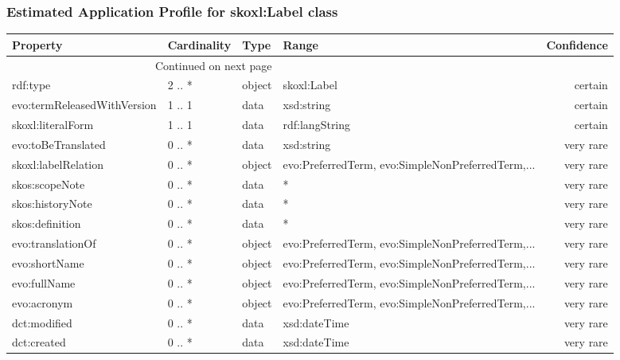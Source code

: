 \documentclass[10pt,a4paper,titlepage,final]{article}
\begin{document}
\subsubsection{Estimated Application Profile for skoxl:Label class}
\begin{tabularx}{\textwidth}{lllXr}
\toprule
                    Property & Cardinality &    Type &                                              Range & Confidence \\
\midrule
\endhead
\midrule
\multicolumn{3}{r}{{Continued on next page}} \\
\midrule
\endfoot

\bottomrule
\endlastfoot
                    rdf:type &      2 .. * &  object &                                        skoxl:Label &    certain \\
 evo:termReleasedWithVersion &      1 .. 1 &    data &                                         xsd:string &    certain \\
           skoxl:literalForm &      1 .. 1 &    data &                                     rdf:langString &    certain \\
          evo:toBeTranslated &      0 .. * &    data &                                         xsd:string &  very rare \\
         skoxl:labelRelation &      0 .. * &  object &  evo:PreferredTerm, evo:SimpleNonPreferredTerm,... &  very rare \\
              skos:scopeNote &      0 .. * &    data &                                                  * &  very rare \\
            skos:historyNote &      0 .. * &    data &                                                  * &  very rare \\
             skos:definition &      0 .. * &    data &                                                  * &  very rare \\
           evo:translationOf &      0 .. * &  object &  evo:PreferredTerm, evo:SimpleNonPreferredTerm,... &  very rare \\
               evo:shortName &      0 .. * &  object &  evo:PreferredTerm, evo:SimpleNonPreferredTerm,... &  very rare \\
                evo:fullName &      0 .. * &  object &  evo:PreferredTerm, evo:SimpleNonPreferredTerm,... &  very rare \\
                 evo:acronym &      0 .. * &  object &  evo:PreferredTerm, evo:SimpleNonPreferredTerm,... &  very rare \\
                dct:modified &      0 .. * &    data &                                       xsd:dateTime &  very rare \\
                 dct:created &      0 .. * &    data &                                       xsd:dateTime &  very rare \\
\end{tabularx}
\end{document}
